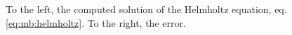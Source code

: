 \begin{figure}
  \centering   
 \hspace{5pt}
\caption[The computed solution and the error of the Helmholtz
  equation.]{To the left, the computed solution of the Helmholtz
  equation, eq. \eqref{eq:mb:helmholtz}. To the right, the error.}
\label{traj}
\end{figure}
